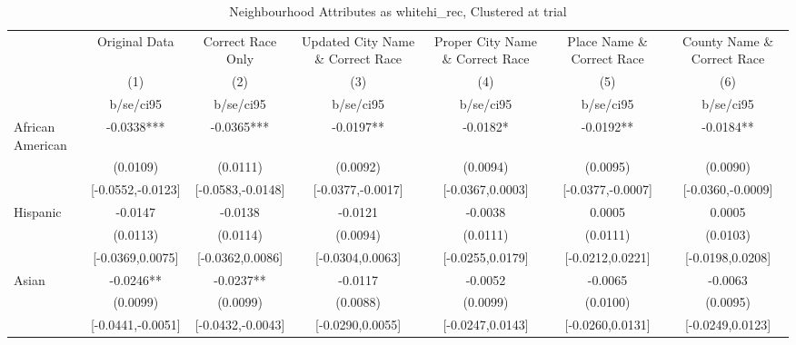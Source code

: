 \documentclass{article}
\begin{document}
\begin{table}[htbp]\centering
\def\sym#1{\ifmmode^{#1}\else\(^{#1}\)\fi}
\caption{Neighbourhood Attributes as whitehi\_rec, Clustered at trial}
\begin{tabular}{l*{6}{c}}
\toprule
                    &\multicolumn{1}{c}{Original Data}&\multicolumn{1}{c}{Correct Race Only}&\multicolumn{1}{c}{Updated City Name \& Correct Race}&\multicolumn{1}{c}{Proper City Name \& Correct Race}&\multicolumn{1}{c}{Place Name \& Correct Race}&\multicolumn{1}{c}{County Name \& Correct Race}\\\cmidrule(lr){2-2}\cmidrule(lr){3-3}\cmidrule(lr){4-4}\cmidrule(lr){5-5}\cmidrule(lr){6-6}\cmidrule(lr){7-7}
                    &\multicolumn{1}{c}{(1)}   &\multicolumn{1}{c}{(2)}   &\multicolumn{1}{c}{(3)}   &\multicolumn{1}{c}{(4)}   &\multicolumn{1}{c}{(5)}   &\multicolumn{1}{c}{(6)}   \\
                    &   b/se/ci95   &   b/se/ci95   &   b/se/ci95   &   b/se/ci95   &   b/se/ci95   &   b/se/ci95   \\
\midrule
African American    &     -0.0338***&     -0.0365***&     -0.0197** &     -0.0182*  &     -0.0192** &     -0.0184** \\
                    &    (0.0109)   &    (0.0111)   &    (0.0092)   &    (0.0094)   &    (0.0095)   &    (0.0090)   \\
                    &[-0.0552,-0.0123]   &[-0.0583,-0.0148]   &[-0.0377,-0.0017]   &[-0.0367,0.0003]   &[-0.0377,-0.0007]   &[-0.0360,-0.0009]   \\
Hispanic            &     -0.0147   &     -0.0138   &     -0.0121   &     -0.0038   &      0.0005   &      0.0005   \\
                    &    (0.0113)   &    (0.0114)   &    (0.0094)   &    (0.0111)   &    (0.0111)   &    (0.0103)   \\
                    &[-0.0369,0.0075]   &[-0.0362,0.0086]   &[-0.0304,0.0063]   &[-0.0255,0.0179]   &[-0.0212,0.0221]   &[-0.0198,0.0208]   \\
Asian               &     -0.0246** &     -0.0237** &     -0.0117   &     -0.0052   &     -0.0065   &     -0.0063   \\
                    &    (0.0099)   &    (0.0099)   &    (0.0088)   &    (0.0099)   &    (0.0100)   &    (0.0095)   \\
                    &[-0.0441,-0.0051]   &[-0.0432,-0.0043]   &[-0.0290,0.0055]   &[-0.0247,0.0143]   &[-0.0260,0.0131]   &[-0.0249,0.0123]   \\

\end{tabular}
\end{table}
\end{document}
